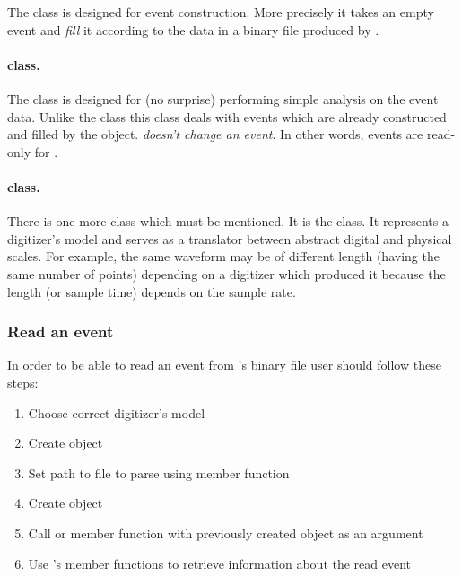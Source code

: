 The  class is designed for event construction. More precisely it takes
an empty event and \emph{fill} it according to the data in a binary file produced by
.

\paragraph*{ class.}

The  class is designed for (no surprise) performing simple analysis on the
event data. Unlike the  class this class deals with events which are already 
constructed and filled by the  object.
 \emph{doesn't change an event}. In other words, events are read-only for
. 

\paragraph*{ class.}
There is one more class which must be mentioned. It is the  class. It
represents a digitizer's model and serves as a translator between abstract
digital and physical scales. For example, the same waveform may be of different length
(having the same number of points) depending on a digitizer which produced it because
the length (or sample time) depends on the sample rate. 

\subsubsection{Read an event}
In order to be able to read an event from 's binary file user should follow these
steps: 
\begin{enumerate}
    \item Choose correct digitizer's model 
    \item Create  object
    \item Set path to file to parse using  member function
    \item Create  object
    \item Call  or  member function
with previously created  object as an argument
    \item Use 's member functions to retrieve information about the read
event
\end{enumerate}

